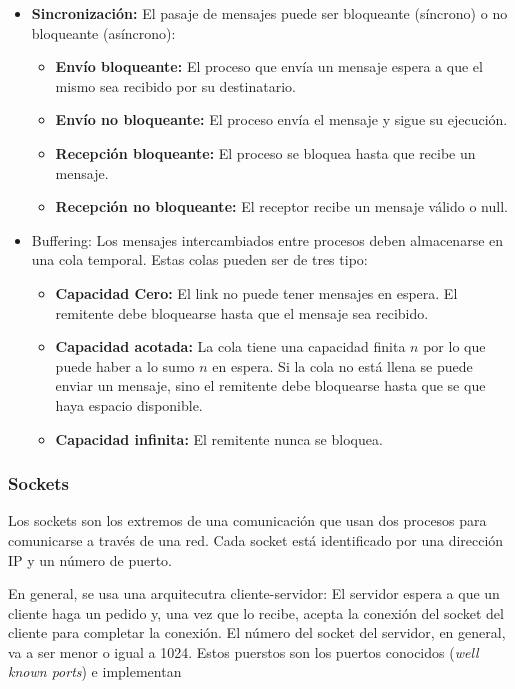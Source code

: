 \begin{itemize}
\begin{itemize}
	\end{itemize}
	\item \textbf{Sincronización:} El pasaje de mensajes puede ser bloqueante (síncrono) o no bloqueante (asíncrono):
	\begin{itemize}
		\item \textbf{Envío bloqueante:} El proceso que envía un mensaje espera a que el mismo sea recibido por su destinatario.
		\item \textbf{Envío no bloqueante:} El proceso envía el mensaje y sigue su ejecución.
		\item \textbf{Recepción bloqueante:} El proceso se bloquea hasta que recibe un mensaje.
		\item\textbf{Recepción no bloqueante:} El receptor recibe un mensaje válido o null.
	\end{itemize}
	\item Buffering: Los mensajes intercambiados entre procesos deben almacenarse en una cola temporal. Estas colas pueden ser de tres tipo:
	\begin{itemize}
		\item\textbf{Capacidad Cero:} El link no puede tener mensajes en espera. El remitente debe bloquearse hasta que el mensaje sea recibido.
		\item \textbf{Capacidad acotada:} La cola tiene una capacidad finita $n$ por lo que puede haber a lo sumo $n$ en espera. Si la cola no está llena se puede enviar un mensaje, sino el remitente debe bloquearse hasta que se que haya espacio disponible.
		\item \textbf{Capacidad infinita:} El remitente nunca se bloquea.
	\end{itemize}
\end{itemize}

\subsubsection{Sockets}
Los sockets son los extremos de una comunicación que usan dos procesos para comunicarse a través de una red. Cada socket está identificado por una dirección IP y un número de puerto. 	

En general, se usa una arquitecutra cliente-servidor: El servidor espera a que un cliente haga un pedido y, una vez que lo recibe, acepta la conexión del socket del cliente para completar la conexión. El número del socket del servidor, en general, va a ser menor o igual a 1024. Estos puerstos son los puertos conocidos (\textit{well known ports}) e implementan

